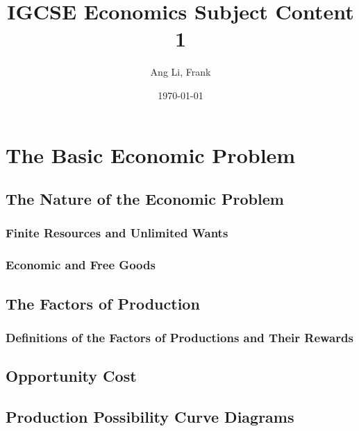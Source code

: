 \documentclass[12pt, a4paper, openany]{book}
\title{\textbf{IGCSE Economics Subject Content 1}}
\author{Ang Li, Frank}
\date{\today}
\begin{document}
\fancyhf{}
\renewcommand{\headrulewidth}{2pt}
\renewcommand{\footrulewidth}{1pt}
\fancyhead[LE]{\leftmark}
\fancyhead[RO]{\nouppercase{\rightmark}}
\fancyfoot[LE, RO]{\thepage}

\maketitle
\tableofcontents

\chapter{The Basic Economic Problem}

\blindmathtrue

\section{The Nature of the Economic Problem}
\blindtext[1]
\subsection{Finite Resources and Unlimited Wants}
\blindtext[1]
\subsection{Economic and Free Goods}
\blindtext[1]
\section{The Factors of Production}
\blindtext[1]
\subsection{Definitions of the Factors of Productions and Their Rewards}
\blindtext[1]
\section{Opportunity Cost}
\blindtext[1]
\section{Production Possibility Curve Diagrams}
\blindtext[1]
\end{document}
